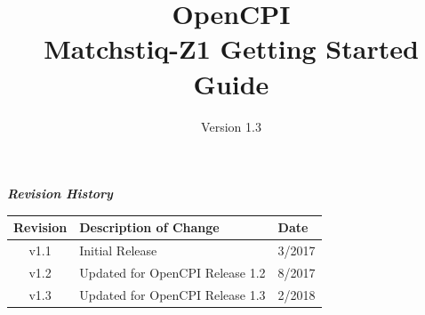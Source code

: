 \def\docTitle{OpenCPI\\ Matchstiq-Z1 Getting Started Guide}
\def\docVersion{1.3}

\date{Version \docVersion} %
\title{\docTitle}
\usepackage[T1]{fontenc} %
\usepackage{graphicx}
\graphicspath{ {figures/} }
\usepackage{textcomp}

\maketitle
\newpage

	\begin{center}
	\textit{\textbf{Revision History}}
		\begin{table}[H]
		\label{table:revisions} %
			\begin{tabularx}{\textwidth}{|c|X|l|}
			\hline
			\rowcolor{blue}
			\textbf{Revision} & \textbf{Description of Change} & \textbf{Date} \\
		    \hline
            v1.1 & Initial Release & 3/2017 \\
            \hline
            v1.2 & Updated for OpenCPI Release 1.2 & 8/2017 \\
            \hline
            v1.3 & Updated for OpenCPI Release 1.3 & 2/2018 \\
            \hline
			\end{tabularx}
		\end{table}
	\end{center}

